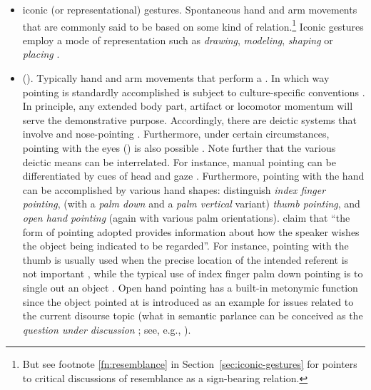 \documentclass[output=paper]{langsci/langscibook}
\begin{document}
\begin{itemize}
\item iconic (or representational)   gestures. Spontaneous hand and arm movements that are commonly said to be based on some kind of   relation.\footnote{But see footnote \ref{fn:resemblance} in Section~\ref{sec:iconic-gestures} for pointers to critical discussions of resemblance as a sign-bearing relation.} Iconic gestures employ a mode of representation such as \textit{drawing}, \textit{modeling}, \textit{shaping} or \textit{placing} \citep{Streeck:2008,Mueller:1998}.
\item {} (). Typically hand and arm movements that perform a . 
%
In which way pointing is standardly accomplished is subject to culture-specific conventions \citep{Wilkins:2003}. 
%
In principle, any extended body part, artifact or locomotor momentum will serve the demonstrative purpose. 
%
Accordingly, there are deictic systems that involve  \citep{Enfield:2001} and nose-pointing \citep{Cooperrider:Nunez:2012}. 
%
Furthermore, under certain circumstances, pointing with the eyes () is also possible \citep{Hadjikhani:Hoge:Snyder:de:Gelder:2008}. 
%
Note further that the various deictic means can be interrelated. For instance, manual pointing can be differentiated by cues of head and gaze \citep{Butterworth:Itakura:2000}.
%
Furthermore, pointing with the hand can be accomplished by various hand shapes: \citet{Kendon:Versante:2003} distinguish \emph{index finger pointing},  (with a \emph{palm down}  and a \emph{palm vertical}  variant) \emph{thumb pointing},  and \emph{open hand pointing}  (again with various palm orientations).
%
\citet[]{Kendon:Versante:2003} claim that \enquote{the form of pointing adopted provides information about how the speaker wishes the object being indicated to be regarded}.
%
For instance, pointing with the thumb is usually used when the precise location of the intended referent is not important \citep[--125]{Kendon:Versante:2003}, while the typical use of index finger palm down pointing is to single out an object \citep[]{Kendon:Versante:2003}. 
%
Open hand pointing has a built-in metonymic function since the object pointed at is introduced as an example for issues related to the current disourse topic (what in semantic parlance can be conceived as the \emph{question under discussion} ; see, e.g., \citealp{Ginzburg:2012}).

\end{itemize}
\end{document}
